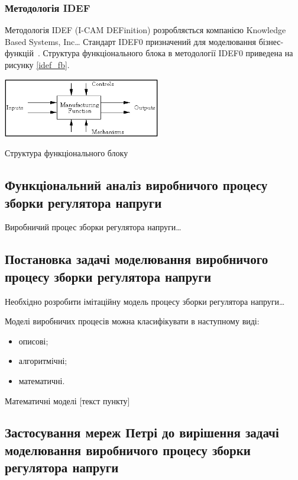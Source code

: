 \subsubsection{Методологія IDEF}
Методологія IDEF (I-CAM DEFinition) розробляється компанією Knowledge Based Systems, Inc…
Стандарт IDEF0 призначений для моделювання
бізнес-функцій~\cite{Sommerville_2010}. Структура функціонального блока в методології IDEF0 приведена на рисунку
\ref{idef_fb}.

\begin{stdfigure}
\includegraphics[width=2.7in]{images/idef_fb.png}
\caption{Структура функціонального блоку}
\label{idef_fb}
\end{stdfigure}

\subsection{Функціональний аналіз виробничого процесу зборки регулятора напруги}

Виробничий процес зборки регулятора напруги…

\subsection{Постановка задачі моделювання виробничого процесу зборки регулятора
напруги}

Необхідно розробити імітаційну модель процесу зборки регулятора напруги…

Моделі виробничих процесів можна класифікувати в наступному виді:
\begin{itemize}
\item описові;
\item алгоритмічні;
\item математичні.
\end{itemize}

Математичні моделі [текст пункту]


\subsection{Застосування мереж Петрі до вирішення задачі моделювання
виробничого процесу зборки регулятора напруги} 

